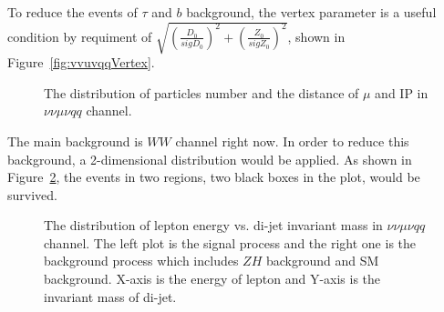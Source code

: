 \documentclass[11pt,a4paper]{cepcnote}
\begin{document}
To reduce the events of $\tau$ and $b$ background, the vertex parameter is a useful condition by requiment of 
$\sqrt{(\frac{D_{0}}{sigD_{0}})^2+(\frac{Z_{0}}{sigZ_{0}})^2}$, shown in Figure~\ref{fig:vvuvqqVertex}. 
\begin{figure}[H]
	\centering
	\caption[]{The distribution of particles number and the distance of $\mu$ and IP in $\nu\nu\mu\nu qq$ channel.
		}
	\label{fig:nnHuvqqremver}
\end{figure}
The main background is $WW$ channel right now. In order to reduce this background, a 2-dimensional distribution would be applied. 
As shown in Figure~\ref{fig:nnHuvqqEnerInvM}, the events in two regions, two black boxes in the plot, would be survived. 
\begin{figure}[H]
	\centering
	\caption[]{The distribution of lepton energy vs. di-jet invariant mass in $\nu\nu\mu\nu qq$ channel. 
		The left plot is the signal process and the right one is the background process which includes $ZH$ background and 
		SM background. X-axis is the energy of lepton and Y-axis is the invariant mass of di-jet.}
	\label{fig:nnHuvqqEnerInvM}
\end{figure}
\end{document}
